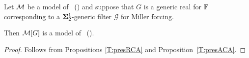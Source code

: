 \begin{thm}
Let $\mathcal{M}$ be a model of \RCAo\ (\ACAo)
and suppose that $G$ is a generic real for $\mathbb{F}$
corresponding to a $\mathbf{\Sigma}^1_2$-generic filter $\mathcal{G}$ for Miller forcing.

Then $\mathcal{M}[G]$ is a model of \RCAo\ (\ACAo).
\end{thm}
\begin{proof}
Follows from Propositions \ref{T:presRCA} and Proposition~\ref{T:presACA}.
\end{proof}
